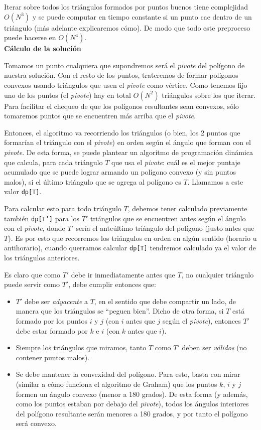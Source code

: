 Iterar sobre todos los triángulos formados por puntos buenos tiene complejidad 
$O(N^3)$ y se puede computar en tiempo constante si un punto cae dentro de un triángulo (más adelante 
explicaremos cómo). 
De modo que todo este preproceso puede hacerse en $O(N^4)$.\\

\textbf{Cálculo de la solución}

Tomamos un punto cualquiera que supondremos será el \textit{pivote} 
del polígono de nuestra solución. Con el resto de los puntos, trateremos de formar polígonos 
convexos usando triángulos que usen el \textit{pivote} como vértice. Como tenemos fijo uno 
de los puntos (el \textit{pivote}) hay en total $O(N^2)$ triángulos sobre los que iterar. 
Para facilitar el chequeo de que los polígonos resultantes sean convexos, 
sólo tomaremos puntos que se encuentren más arriba que el \textit{pivote}.

Entonces, el algoritmo va recorriendo los triángulos (o bien, los 2 puntos que formarían el triángulo 
con el \textit{pivote}) en orden según el ángulo que forman con el \textit{pivote}. De esta forma, 
se puede plantear un algoritmo de programación dinámica que calcula, para cada triángulo $T$ que 
usa el \textit{pivote}: cuál es el mejor puntaje acumulado que se puede lograr armando 
un polígono convexo (y sin puntos malos), si el último triángulo que se agrega al polígono 
es $T$. Llamamos a este valor \texttt{dp[T]}.

Para calcular esto para todo triángulo $T$, debemos tener calculado previamente también 
\texttt{dp[T']} para los $T'$ triángulos que se encuentren antes según el ángulo con el 
\textit{pivote}, donde $T'$ sería el anteúltimo triángulo del polígono (justo antes que $T$). 
Es por esto que recorremos los triángulos en orden en algún sentido (horario u 
antihorario), cuando querramos calcular \texttt{dp[T]} tendremos calculado ya el valor de los triángulos 
anteriores. 

Es claro que como $T'$ debe ir inmediatamente antes que $T$, no cualquier triángulo puede 
servir como $T'$, debe cumplir entonces que: 
\begin{itemize}
\item $T'$ debe ser \textit{adyacente} a $T$, en el sentido que debe compartir un lado, de manera 
que los triángulos se ``peguen bien''. Dicho de otra forma, si $T$ está formado por los puntos $i$ y $j$ 
(con $i$ antes que $j$ según el \textit{pivote}), entonces $T'$ debe estar formado por $k$ e $i$ 
(con $k$ antes que $i$). 
\item Siempre los triángulos que miramos, tanto $T$ como $T'$ deben ser \textit{válidos} (no 
contener puntos malos). 
\item Se debe mantener la convexidad del polígono. Para esto, basta con mirar (similar a cómo 
funciona el algoritmo de Graham) que los puntos $k$, $i$ y $j$ formen un ángulo convexo (menor a 180 grados). 
De esta forma (y además, como los puntos estaban por debajo del \textit{pivote}), 
todos los ángulos interiores del polígono resultante serán menores a 180 grados, y 
por tanto el polígono será convexo. 
\end{itemize}


